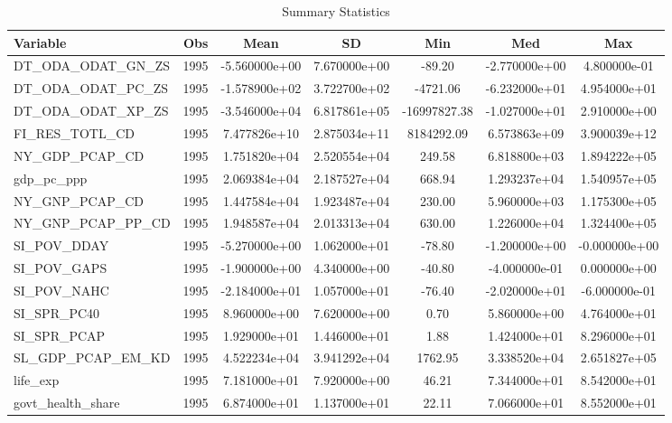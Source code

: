 \begin{table}
\centering
\caption{Summary Statistics}
\label{Sum_Stats}
\begin{tabular}{lcccccc}
\toprule
         Variable &  Obs &          Mean &           SD &          Min &           Med &           Max \\
\midrule
DT\_ODA\_ODAT\_GN\_ZS & 1995 & -5.560000e+00 & 7.670000e+00 & -89.20 & -2.770000e+00 & 4.800000e-01 \\
DT\_ODA\_ODAT\_PC\_ZS & 1995 & -1.578900e+02 & 3.722700e+02 & -4721.06 & -6.232000e+01 & 4.954000e+01 \\
DT\_ODA\_ODAT\_XP\_ZS & 1995 & -3.546000e+04 & 6.817861e+05 & -16997827.38 & -1.027000e+01 & 2.910000e+00 \\
FI\_RES\_TOTL\_CD & 1995 & 7.477826e+10 & 2.875034e+11 & 8184292.09 & 6.573863e+09 & 3.900039e+12 \\
NY\_GDP\_PCAP\_CD & 1995 & 1.751820e+04 & 2.520554e+04 & 249.58 & 6.818800e+03 & 1.894222e+05 \\
gdp\_pc\_ppp & 1995 & 2.069384e+04 & 2.187527e+04 & 668.94 & 1.293237e+04 & 1.540957e+05 \\
NY\_GNP\_PCAP\_CD & 1995 & 1.447584e+04 & 1.923487e+04 & 230.00 & 5.960000e+03 & 1.175300e+05 \\
NY\_GNP\_PCAP\_PP\_CD & 1995 & 1.948587e+04 & 2.013313e+04 & 630.00 & 1.226000e+04 & 1.324400e+05 \\
SI\_POV\_DDAY & 1995 & -5.270000e+00 & 1.062000e+01 & -78.80 & -1.200000e+00 & -0.000000e+00 \\
SI\_POV\_GAPS & 1995 & -1.900000e+00 & 4.340000e+00 & -40.80 & -4.000000e-01 & 0.000000e+00 \\
SI\_POV\_NAHC & 1995 & -2.184000e+01 & 1.057000e+01 & -76.40 & -2.020000e+01 & -6.000000e-01 \\
SI\_SPR\_PC40 & 1995 & 8.960000e+00 & 7.620000e+00 & 0.70 & 5.860000e+00 & 4.764000e+01 \\
SI\_SPR\_PCAP & 1995 & 1.929000e+01 & 1.446000e+01 & 1.88 & 1.424000e+01 & 8.296000e+01 \\
SL\_GDP\_PCAP\_EM\_KD & 1995 & 4.522234e+04 & 3.941292e+04 & 1762.95 & 3.338520e+04 & 2.651827e+05 \\
life\_exp & 1995 & 7.181000e+01 & 7.920000e+00 & 46.21 & 7.344000e+01 & 8.542000e+01 \\
govt\_health\_share & 1995 & 6.874000e+01 & 1.137000e+01 & 22.11 & 7.066000e+01 & 8.552000e+01 \\
\bottomrule
\end{tabular}
\end{table}
